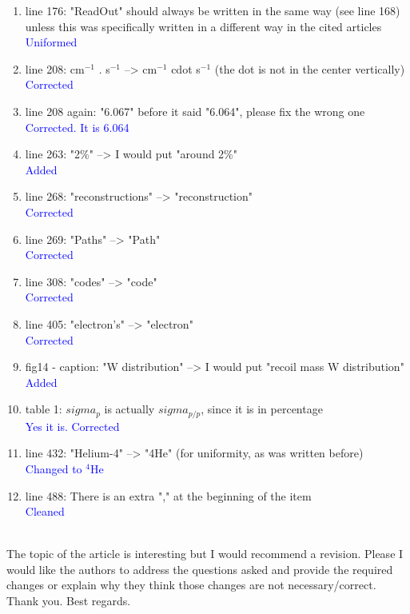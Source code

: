 \documentclass[a4paper,11pt,twoside]{article}
\begin{document}
\begin{enumerate}
\item line 176: "ReadOut" should always be written in the same way (see line 
   168) unless this was specifically written in a different way in the cited 
   articles\\
\textcolor{blue}{Uniformed} 

\item line 208: cm$^{-1}$ . s$^{-1}$ --> cm$^{-1}$ cdot s$^{-1}$ (the dot is 
   not in the center vertically)\\
\textcolor{blue}{Corrected} 

\item line 208 again: "6.067" before it said "6.064", please fix the wrong one
\textcolor{blue}{Corrected. It is 6.064} \\

\item line 263: "2\%" --> I would put "around 2\%"\\
\textcolor{blue}{Added} 

\item line 268: "reconstructions" --> "reconstruction"\\
\textcolor{blue}{Corrected } 

\item line 269: "Paths" --> "Path"\\
\textcolor{blue}{Corrected} 

\item line 308: "codes" --> "code"\\
\textcolor{blue}{Corrected} 

\item line 405: "electron's" --> "electron"\\
\textcolor{blue}{Corrected} 

\item fig14 - caption: "W distribution" --> I would put "recoil mass W 
   distribution"\\
\textcolor{blue}{Added} 

\item table 1: $sigma_{p}$ is actually $sigma_{p/p}$, since it is in 
   percentage\\
\textcolor{blue}{Yes it is. Corrected } 

\item line 432: "Helium-4" --> "4He" (for uniformity, as was written before)\\
\textcolor{blue}{Changed to $^4$He} 

\item line 488: There is an extra "," at the beginning of the item\\
\textcolor{blue}{Cleaned}\\
~\\
\end{enumerate}

The topic of the article is interesting but I would recommend a revision.  
Please I would like the authors to address the questions asked and provide the 
required changes or explain why they think those changes are not 
necessary/correct. Thank you. Best regards.\\
\end{document}
